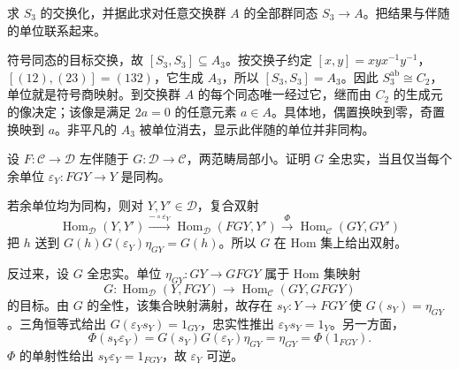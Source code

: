 \begin{exercise}\label{b4:ex:03-s3-abelianization}
	求 \(S_3\) 的交换化，并据此求对任意交换群 \(A\) 的全部群同态 \(S_3\rightarrow A\)。把结果与伴随的单位联系起来。
\end{exercise}
\begin{solution}
	符号同态的目标交换，故 \([S_3,S_3]\subseteq A_3\)。按交换子约定 \([x,y]=xyx^{-1}y^{-1}\)，\([(12),(23)]=(132)\)，它生成 \(A_3\)，所以 \([S_3,S_3]=A_3\)。因此 \(S_3^{\mathrm{ab}}\cong C_2\)，单位就是符号商映射。到交换群 \(A\) 的每个同态唯一经过它，继而由 \(C_2\) 的生成元的像决定；该像是满足 \(2a=0\) 的任意元素 \(a\in A\)。具体地，偶置换映到零，奇置换映到 \(a\)。非平凡的 \(A_3\) 被单位消去，显示此伴随的单位并非同构。
\end{solution}

\begin{exercise}\label{b4:ex:03-fully-faithful-adjoint}
	设 \(F:\mathcal C\rightarrow\mathcal D\) 左伴随于 \(G:\mathcal D\rightarrow\mathcal C\)，两范畴局部小。证明 \(G\) 全忠实，当且仅当每个余单位 \(\varepsilon_Y:FGY\rightarrow Y\) 是同构。
\end{exercise}
\begin{solution}
	若余单位均为同构，则对 \(Y,Y'\in\mathcal D\)，复合双射
	\[
		\operatorname{Hom}_{\mathcal D}(Y,Y') \xrightarrow{-\circ\varepsilon_Y} \operatorname{Hom}_{\mathcal D}(FGY,Y') \xrightarrow{\Phi} \operatorname{Hom}_{\mathcal C}(GY,GY')
	\]
	把 \(h\) 送到 \(G(h)G(\varepsilon_Y)\eta_{GY}=G(h)\)。所以 \(G\) 在 Hom 集上给出双射。

	反过来，设 \(G\) 全忠实。单位 \(\eta_{GY}:GY\rightarrow GFGY\) 属于 Hom 集映射
	\[
		G:\operatorname{Hom}_{\mathcal D}(Y,FGY) \longrightarrow\operatorname{Hom}_{\mathcal C}(GY,GFGY)
	\]
	的目标。由 \(G\) 的全性，该集合映射满射，故存在 \(s_Y:Y\rightarrow FGY\) 使 \(G(s_Y)=\eta_{GY}\)。三角恒等式给出 \(G(\varepsilon_Ys_Y)=1_{GY}\)，忠实性推出 \(\varepsilon_Ys_Y=1_Y\)。另一方面，
	\[
		\Phi(s_Y\varepsilon_Y) =G(s_Y)G(\varepsilon_Y)\eta_{GY} =\eta_{GY}=\Phi(1_{FGY}).
	\]
	\(\Phi\) 的单射性给出 \(s_Y\varepsilon_Y=1_{FGY}\)，故 \(\varepsilon_Y\) 可逆。
\end{solution}

